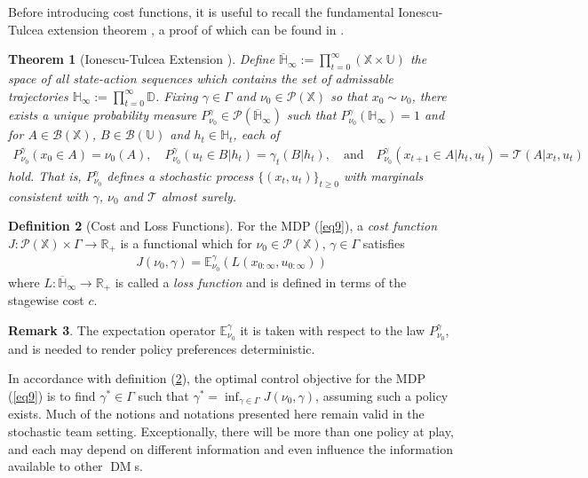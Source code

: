 \documentclass[12pt, oneside]{report}
\newcommand{\E}{\mathbb{E}}
\newcommand{\mbb}[1]{\mathbb{#1}}
\newcommand{\1}[1]{\mathbbm{1}_{\{#1\}}}
\newcommand{\mc}[1]{\mathcal{#1}}
\DeclareMathOperator{\DM}{DM} \DeclareMathOperator{\argmin}{argmin}
\newtheorem{theorem}{Theorem}[section]
\theoremstyle{definition}
\newtheorem{definition}[theorem]{Definition}
\newtheorem{remark}[theorem]{Remark}
\begin{document}
Before introducing cost functions, it is useful to recall the fundamental
Ionescu-Tulcea extension theorem \cite{Ionescu-Tulcea_1949}, a proof of which can be
found in \cite[proposition 7.28]{Bertsekas_Shreve_2007}.
\begin{theorem}[Ionescu-Tulcea Extension \cite{Ionescu-Tulcea_1949}]\label{thm6}
    Define $\overline{\mbb{H}}_\infty:=\prod_{t=0}^\infty(\mbb{X}\times\mbb{U})$
    the space of all state-action sequences which contains the set of admissable
    trajectories $\mbb{H}_\infty:=\prod_{t=0}^\infty\mbb{D}$. Fixing
    $\gamma\in\Gamma$ and $\nu_0\in\mc{P}(\mbb{X})$ so that $x_0\sim\nu_0$,
    there exists a unique probability measure
    $P^\gamma_{\nu_0}\in\mc{P}(\overline{\mbb{H}}_\infty)$ such that
    $P^\gamma_{\nu_0}(\mbb{H}_\infty)=1$ and for $A\in\mc{B}(\mbb{X})$,
    $B\in\mc{B}(\mbb{U})$ and $h_t\in\mbb{H}_t$, each of
    \begin{align*}
        P^\gamma_{\nu_0}(x_0\in A)=\nu_0(A),\quad P^\gamma_{\nu_0}(u_t\in B|h_t)=\gamma_t(B|h_t),\quad\text{and}\quad P^\gamma_{\nu_0}(x_{t+1}\in A|h_t,u_t)=\mc{T}(A|x_t,u_t)
    \end{align*}
    hold. That is, $P^\gamma_{\nu_0}$ defines a stochastic process
    $\{(x_t,u_t)\}_{t\geq 0}$ with marginals consistent with $\gamma$, $\nu_0$ and $\mc{T}$
    almost surely.    
\end{theorem}
\begin{definition}[Cost and Loss Functions]\label{def6} For the MDP 
(\ref{eq9}), a {\it cost function}
$J:\mc{P}(\mbb{X})\times\Gamma\rightarrow\mbb{R}_+$ is a functional which for
$\nu_0\in\mc{P}(\mbb{X})$, $\gamma\in\Gamma$ satisfies
    \begin{align*}
        J(\nu_0,\gamma)=\E^\gamma_{\nu_0}\left(L(x_{0:\infty},u_{0:\infty})\right)
    \end{align*}
    where $L:\overline{\mbb{H}}_\infty\rightarrow\mbb{R}_+$ is called a {\it
    loss function} and is defined in terms of the stagewise cost $c$.
\end{definition}
\begin{remark}
    The expectation operator $\E^\gamma_{\nu_0}$ it is taken with respect to the
    law $P^\gamma_{\nu_0}$, and is needed to render policy preferences
    deterministic. 
\end{remark}
In accordance with definition (\ref{def6}), the optimal control objective for the
MDP (\ref{eq9}) is to find $\gamma^\ast\in\Gamma$ such that
$\gamma^\ast=\inf_{\gamma\in\Gamma}J(\nu_0,\gamma)$, assuming such a policy
exists. Much of the notions and notations presented here remain valid in the stochastic team setting.
Exceptionally, there will be more than one policy at play, and each may depend on different information
and even influence the information available to other $\DM$s. 
\end{document}
